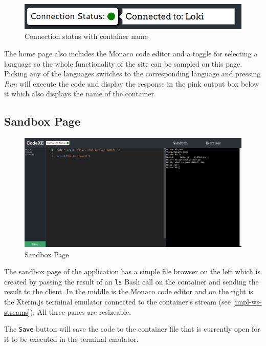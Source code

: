 \begin{figure}[h!]
    \centering
    \includegraphics[width=\linewidth]{res/connection_status_with_popout.png}
    \caption{Connection status with container name}
    \label{fig:connection-popout}
\end{figure}

The home page also includes the Monaco code editor and a toggle for selecting a language so the whole functionality of the site can be sampled on this page. Picking any of the languages switches to the corresponding language and pressing \textit{Run} will execute the code and display the response in the pink output box below it which also displays the name of the container.

\subsection{Sandbox Page}

\begin{figure}[h!]
    \centering
    \includegraphics[width=\linewidth]{res/sandbox_page.png}
    \caption{Sandbox Page}
    \label{fig:sandboxpage}
\end{figure}

The sandbox page of the application has a simple file browser on the left which is created by passing the result of an \texttt{ls} Bash call on the container and sending the result to the client. In the middle is the Monaco code editor and on the right is the Xterm.js terminal emulator connected to the container's stream (see \ref{impl-ws-streams}). All three panes are resizeable.

The \texttt{Save} button will save the code to the container file that is currently open for it to be executed in the terminal emulator.


